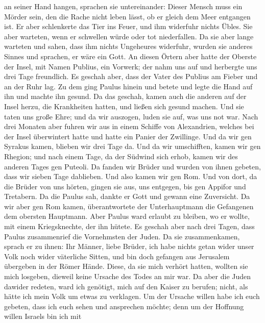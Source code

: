 an seiner Hand hangen, sprachen sie untereinander: Dieser Mensch muss
ein Mörder sein, den die Rache nicht leben lässt, ob er gleich dem Meer
entgangen ist.  Er aber schlenkerte das Tier ins Feuer, und
ihm widerfuhr nichts Übles.  Sie aber warteten, wenn er
schwellen würde oder tot niederfallen. Da sie aber lange warteten und
sahen, dass ihm nichts Ungeheures widerfuhr, wurden sie anderes Sinnes
und sprachen, er wäre ein Gott.  An diesen Örtern aber hatte
der Oberste der Insel, mit Namen Publius, ein Vorwerk; der nahm uns auf
und herbergte uns drei Tage freundlich.  Es geschah aber,
dass der Vater des Publius am Fieber und an der Ruhr lag. Zu dem ging
Paulus hinein und betete und legte die Hand auf ihn und machte ihn
gesund.  Da das geschah, kamen auch die anderen auf der
Insel herzu, die Krankheiten hatten, und ließen sich gesund machen.
 Und sie taten uns große Ehre; und da wir auszogen, luden
sie auf, was uns not war.  Nach drei Monaten aber fuhren
wir aus in einem Schiffe von Alexandrien, welches bei der Insel
überwintert hatte und hatte ein Panier der Zwillinge.  Und
da wir gen Syrakus kamen, blieben wir drei Tage da.  Und da
wir umschifften, kamen wir gen Rhegion; und nach einem Tage, da der
Südwind sich erhob, kamen wir des anderen Tages gen Puteoli.
 Da fanden wir Brüder und wurden von ihnen gebeten, dass
wir sieben Tage dablieben. Und also kamen wir gen Rom.  Und
von dort, da die Brüder von uns hörten, gingen sie aus, uns entgegen,
bis gen Appifor und Tretabern. Da die Paulus sah, dankte er Gott und
gewann eine Zuversicht.  Da wir aber gen Rom kamen,
überantwortete der Unterhauptmann die Gefangenen dem obersten Hauptmann.
Aber Paulus ward erlaubt zu bleiben, wo er wollte, mit einem
Kriegsknechte, der ihn hütete.  Es geschah aber nach drei
Tagen, dass Paulus zusammenrief die Vornehmsten der Juden. Da sie
zusammenkamen, sprach er zu ihnen: Ihr Männer, liebe Brüder, ich habe
nichts getan wider unser Volk noch wider väterliche Sitten, und bin doch
gefangen aus Jerusalem übergeben in der Römer Hände. 
Diese, da sie mich verhört hatten, wollten sie mich losgeben, dieweil
keine Ursache des Todes an mir war.  Da aber die Juden
dawider redeten, ward ich genötigt, mich auf den Kaiser zu berufen;
nicht, als hätte ich mein Volk um etwas zu verklagen.  Um
der Ursache willen habe ich euch gebeten, dass ich euch sehen und
ansprechen möchte; denn um der Hoffnung willen Israels bin ich mit
